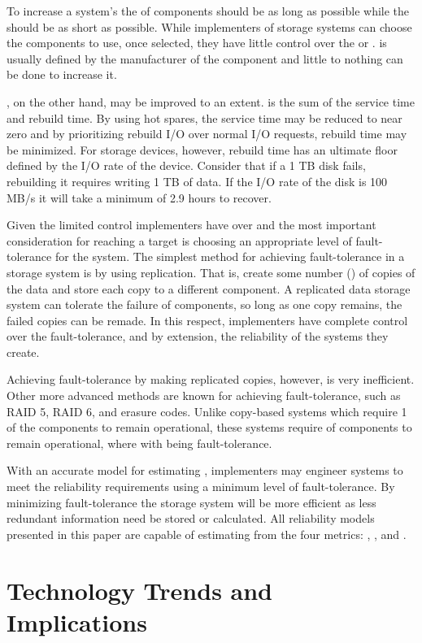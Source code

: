 \documentclass[XXX,endnotes]{usetex-v1}
\begin{document}
To increase a system's  the  of components should be as long as possible while the  should be as short as possible.  While implementers of storage systems can choose the components to use, once selected, they have little control over the  or .   is usually defined by the manufacturer of the component and little to nothing can be done to increase it.

, on the other hand, may be improved to an extent.   is the sum of the service time and rebuild time.  By using hot spares, the service time may be reduced to near zero and by prioritizing rebuild I/O over normal I/O requests, rebuild time may be minimized.  For storage devices, however, rebuild time has an ultimate floor defined by the I/O rate of the device.  Consider that if a 1 TB disk fails, rebuilding it requires writing 1 TB of data.  If the I/O rate of the disk is 100 MB/s it will take a minimum of 2.9 hours to recover.

Given the limited control implementers have over  and  the most important consideration for reaching a target  is choosing an appropriate level of fault-tolerance for the system.  The simplest method for achieving fault-tolerance in a storage system is by using replication.  That is, create some number () of copies of the data and store each copy to a different component.  A replicated data storage system can tolerate the failure of  components, so long as one copy remains, the failed copies can be remade.  In this respect, implementers have complete control over the fault-tolerance, and by extension, the reliability of the systems they create.

Achieving fault-tolerance by making replicated copies, however, is very inefficient.  Other more advanced methods are known for achieving fault-tolerance, such as RAID 5, RAID 6, and erasure codes.  Unlike copy-based systems which require 1 of the  components to remain operational, these systems require  of  components to remain operational, where  with  being fault-tolerance.

With an accurate model for estimating , implementers may engineer systems to meet the reliability requirements using a minimum level of fault-tolerance.  By minimizing fault-tolerance the storage system will be more efficient as less redundant information need be stored or calculated.  All reliability models presented in this paper are capable of estimating  from the four metrics: , ,  and .

\section{Technology Trends and Implications}
\end{document}
